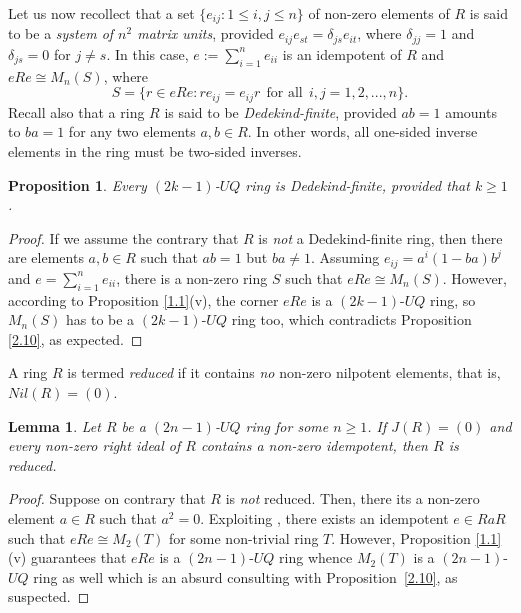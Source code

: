 \documentclass[10pt,a4paper]{amsart}
\newtheorem{proposition}[theorem]{Proposition}
\newtheorem{lemma}[theorem]{Lemma}
\begin{document}
Let us now recollect that a set $\{e_{ij} : 1 \le i, j \le n\}$ of non-zero elements of $R$ is said to be a {\it system of $n^2$ matrix units}, provided $e_{ij}e_{st} = \delta_{js}e_{it}$, where $\delta_{jj} = 1$ and $\delta_{js} = 0$ for $j \neq s$. In this case, $e := \sum_{i=1}^{n} e_{ii}$ is an idempotent of $R$ and $eRe \cong M_n(S)$, where $$S = \{r \in eRe : re_{ij} = e_{ij}r~~\textrm{for all}~~ i, j = 1, 2, . . . , n\}.$$
Recall also that a ring $R$ is said to be {\it Dedekind-finite}, provided $ab=1$ amounts to $ba=1$ for any two elements $a,b\in R$. In other words, all one-sided inverse elements in the ring must be two-sided inverses.

\begin{proposition}\label{2.11}
Every $(2k-1)$-$UQ$ ring is Dedekind-finite, provided that $k\geq 1$.
\end{proposition}

\begin{proof}
If we assume the contrary that $R$ is {\it not} a Dedekind-finite ring, then there are elements $a, b \in R$ such that $ab = 1$ but $ba \neq 1$. Assuming $e_{ij} = a^i(1-ba)b^j$ and $e =\sum_{i=1}^{n}e_{ii}$, there is a non-zero ring $S$ such that $eRe \cong M_n(S)$. However, according to Proposition \ref{1.1}(v), the corner $eRe$ is a $(2k-1)$-$UQ$ ring, so $M_n(S)$ has to be a $(2k-1)$-$UQ$ ring too, which contradicts Proposition \ref{2.10}, as expected.
\end{proof}

A ring $R$ is termed {\it reduced} if it contains {\it no} non-zero nilpotent elements, that is, $Nil(R) = (0)$.

\begin{lemma}\label{2.12}
Let \(R\) be a $(2n-1)$-$UQ$ ring for some $n\geq 1$. If \(J(R) = (0)\) and every non-zero right ideal of \(R\) contains a non-zero idempotent, then \(R\) is reduced.
\end{lemma}

\begin{proof}
Suppose on contrary that \(R\) is {\it not} reduced. Then, there its a non-zero element \(a \in R\) such that \(a^2 = 0\). Exploiting \cite[Theorem 2.1]{9}, there exists an idempotent \(e \in RaR\) such that \(eRe \cong M_2(T)\) for some non-trivial ring \(T\). However, Proposition \ref{1.1}(v) guarantees that $eRe$ is a $(2n-1)$-$UQ$ ring whence $M_2(T)$ is a $(2n-1)$-$UQ$ ring as well which is an absurd consulting with Proposition~\ref{2.10}, as suspected.
\end{proof}
\end{document}
